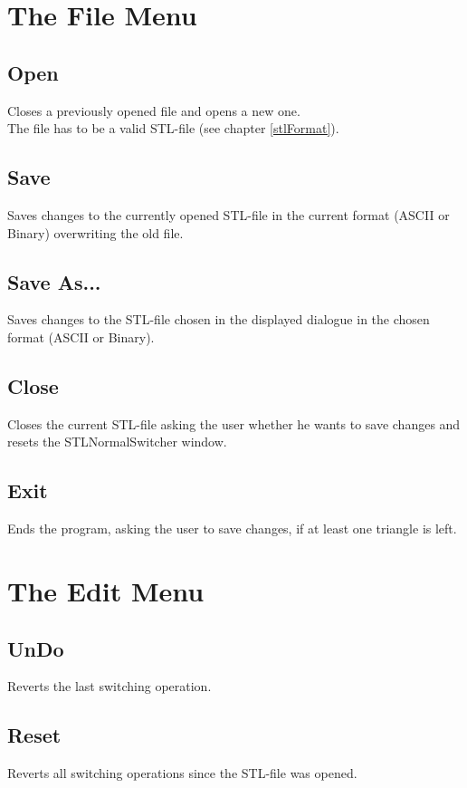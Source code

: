 \section{The File Menu}

\subsection{Open}
Closes a previously opened file and opens a new one.\\
The file has to be a valid STL-file (see chapter \ref{stlFormat}).

\subsection{Save}
Saves changes to the currently opened STL-file in the current format (ASCII or Binary) overwriting the old file.

\subsection{Save As...}
Saves changes to the STL-file chosen in the displayed dialogue in the chosen format (ASCII or Binary).

\subsection{Close}
Closes the current STL-file asking the user whether he wants to save changes and resets the STLNormalSwitcher window.

\subsection{Exit}
Ends the program, asking the user to save changes, if at least one triangle is left.

\newpage
\section{The Edit Menu}

\subsection{UnDo}
Reverts the last switching operation.

\subsection{Reset}
Reverts all switching operations since the STL-file was opened.


